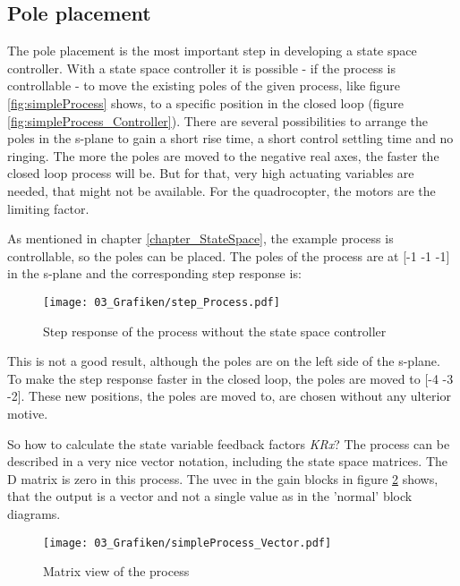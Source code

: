 \subsection{Pole placement}\label{chapter_PolePlace}

The pole placement is the most important step in developing a state space controller. With a state space controller it is possible - if the process is controllable - to move the existing poles of the given process, like figure \ref{fig:simpleProcess} shows, to a specific position in the closed loop (figure \ref{fig:simpleProcess_Controller}). There are several possibilities to arrange the poles in the s-plane to gain a short rise time, a short control settling time and no ringing. The more the poles are moved to the negative real axes, the faster the closed loop process will be. But for that, very high actuating variables are needed, that might not be available. For the quadrocopter, the motors are the limiting factor.

As mentioned in chapter \ref{chapter_StateSpace}, the example process is controllable, so the poles can be placed. 
The poles of the process are at [-1 -1 -1] in the s-plane and the corresponding step response is:

\begin{figure}
	\centering
		\texttt{[image: 03\_Grafiken/step\_Process.pdf]}
	\caption{Step response of the process without the state space controller}
	\label{fig:stepProcess}
\end{figure}

This is not a good result, although the poles are on the left side of the s-plane. To make the step response faster in the closed loop, the poles are moved to [-4 -3 -2]. These new positions, the poles are moved to, are chosen without any ulterior motive.

So how to calculate the state variable feedback factors \textit{KRx}?
The process can be described in a very nice vector notation, including the state space matrices. The D matrix is zero in this process. The uvec in the gain blocks in figure \ref{fig:simpleProcess_Vector} shows, that the output is a vector and not a single value as in the 'normal' block diagrams.

\begin{figure}
	\centering
		\texttt{[image: 03\_Grafiken/simpleProcess\_Vector.pdf]}
	\caption{Matrix view of the process}
	\label{fig:simpleProcess_Vector}
\end{figure}

